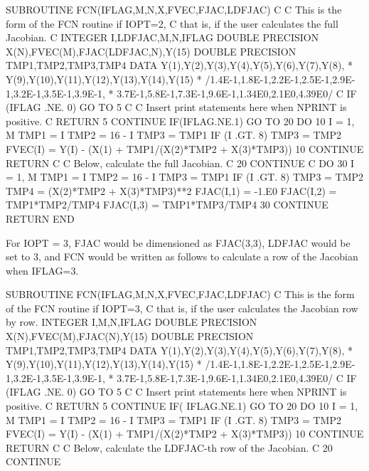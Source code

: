 \documentclass[11pt,twoside,nolof]{starlink}
\begin{document}
\begin{terminalv}
       SUBROUTINE FCN(IFLAG,M,N,X,FVEC,FJAC,LDFJAC)
 C
 C     This is the form of the FCN routine if IOPT=2,
 C     that is, if the user calculates the full Jacobian.
 C
       INTEGER I,LDFJAC,M,N,IFLAG
       DOUBLE PRECISION X(N),FVEC(M),FJAC(LDFJAC,N),Y(15)
       DOUBLE PRECISION TMP1,TMP2,TMP3,TMP4
       DATA Y(1),Y(2),Y(3),Y(4),Y(5),Y(6),Y(7),Y(8),
      *     Y(9),Y(10),Y(11),Y(12),Y(13),Y(14),Y(15)
      *     /1.4E-1,1.8E-1,2.2E-1,2.5E-1,2.9E-1,3.2E-1,3.5E-1,3.9E-1,
      *      3.7E-1,5.8E-1,7.3E-1,9.6E-1,1.34E0,2.1E0,4.39E0/
 C
       IF (IFLAG .NE. 0) GO TO 5
 C
 C     Insert print statements here when NPRINT is positive.
 C
       RETURN
     5 CONTINUE
       IF(IFLAG.NE.1) GO TO 20
       DO 10 I = 1, M
          TMP1 = I
          TMP2 = 16 - I
          TMP3 = TMP1
          IF (I .GT. 8) TMP3 = TMP2
          FVEC(I) = Y(I) - (X(1) + TMP1/(X(2)*TMP2 + X(3)*TMP3))
    10    CONTINUE
       RETURN
 C
 C     Below, calculate the full Jacobian.
 C
    20    CONTINUE
 C
       DO 30 I = 1, M
          TMP1 = I
          TMP2 = 16 - I
          TMP3 = TMP1
          IF (I .GT. 8) TMP3 = TMP2
          TMP4 = (X(2)*TMP2 + X(3)*TMP3)**2
          FJAC(I,1) = -1.E0
          FJAC(I,2) = TMP1*TMP2/TMP4
          FJAC(I,3) = TMP1*TMP3/TMP4
    30    CONTINUE
       RETURN
       END


       For IOPT = 3, FJAC would be dimensioned as FJAC(3,3),
         LDFJAC would be set to 3, and FCN would be written as
         follows to calculate a row of the Jacobian when IFLAG=3.

       SUBROUTINE FCN(IFLAG,M,N,X,FVEC,FJAC,LDFJAC)
 C     This is the form of the FCN routine if IOPT=3,
 C     that is, if the user calculates the Jacobian row by row.
       INTEGER I,M,N,IFLAG
       DOUBLE PRECISION X(N),FVEC(M),FJAC(N),Y(15)
       DOUBLE PRECISION TMP1,TMP2,TMP3,TMP4
       DATA Y(1),Y(2),Y(3),Y(4),Y(5),Y(6),Y(7),Y(8),
      *     Y(9),Y(10),Y(11),Y(12),Y(13),Y(14),Y(15)
      *     /1.4E-1,1.8E-1,2.2E-1,2.5E-1,2.9E-1,3.2E-1,3.5E-1,3.9E-1,
      *      3.7E-1,5.8E-1,7.3E-1,9.6E-1,1.34E0,2.1E0,4.39E0/
 C
       IF (IFLAG .NE. 0) GO TO 5
 C
 C     Insert print statements here when NPRINT is positive.
 C
       RETURN
     5 CONTINUE
       IF( IFLAG.NE.1) GO TO 20
       DO 10 I = 1, M
          TMP1 = I
          TMP2 = 16 - I
          TMP3 = TMP1
          IF (I .GT. 8) TMP3 = TMP2
          FVEC(I) = Y(I) - (X(1) + TMP1/(X(2)*TMP2 + X(3)*TMP3))
    10    CONTINUE
       RETURN
 C
 C     Below, calculate the LDFJAC-th row of the Jacobian.
 C
    20 CONTINUE


\end{terminalv}
\end{document}
